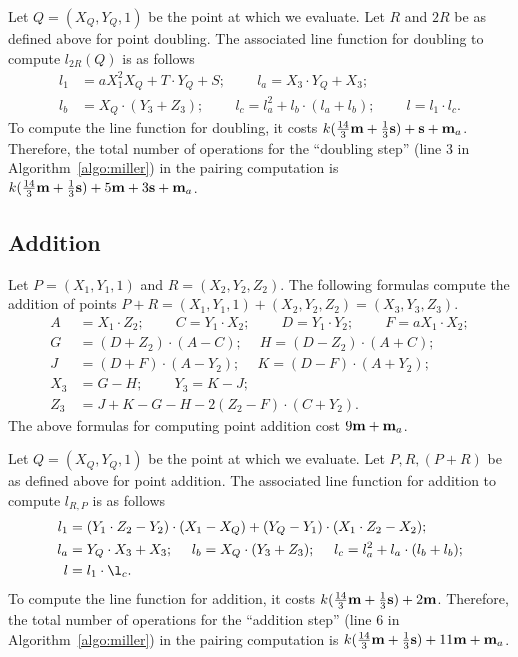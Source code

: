 Let $Q = (X_{Q}, Y_{Q}, 1)$ be the point at which we evaluate.
Let $R$ and $2R$ be as defined above for point doubling.
The associated line function for doubling
to compute $l_{2R}(Q)$ is as follows
\begin{align*}
l_1 &= a X_1^2 X_{Q} + T \cdot Y_{Q} + S;\		\qquad
l_a = X_3 \cdot Y_{Q} + X_3;			\\
l_b &= X_{Q} \cdot (Y_3 + Z_3);\			\qquad
l_c = l_a^2 + l_b \cdot (l_a + l_b);\		\qquad
l = l_1 \cdot l_c.
\end{align*}
To compute the line function for doubling,
it costs 
$k(\frac{14}{3}\textbf{m} + \frac{1}{3}\textbf{s}) + \textbf{s} + \textbf{m}_a$.
Therefore, the total number of operations for the ``doubling step''
({line 3} in Algorithm~\ref{algo:miller}) in the pairing computation is
$k(\frac{14}{3}\textbf{m} + \frac{1}{3}\textbf{s}) + 5\textbf{m} +3\textbf{s} + \textbf{m}_a$.


\subsection{Addition}
Let $P = (X_1,Y_1,1)$ and $R = (X_2,Y_2,Z_2)$.
The following formulas compute the addition of points
$P + R = (X_1,Y_1,1) + (X_2,Y_2,Z_2) = (X_3,Y_3,Z_3)$.
\begin{align*}
A &= X_1 \cdot Z_2;\	\qquad
C = Y_1 \cdot X_2;\	\qquad
D = Y_1 \cdot Y_2;\	\qquad
F = a X_1 \cdot X_2;\\
G &= (D + Z_2) \cdot (A - C);\	\quad
H = (D - Z_2) \cdot (A + C);\\
J &= (D + F) \cdot (A - Y_2);\	\quad
K = (D - F) \cdot (A + Y_2);\\
X_3 &= G - H;\	\qquad
Y_3 = K - J;\\
Z_3 &= J + K - G - H - 2(Z_2 - F) \cdot (C + Y_2).
\end{align*}
The above formulas for computing point addition
cost $9\textbf{m} + \textbf{m}_{a}$.

Let $Q = (X_{Q},Y_{Q},1)$ be the point at which we evaluate.
Let $P,R,(P+R)$ be as defined above for point addition.
The associated line function for addition
to compute $l_{R,P}$ is as follows
\begin{align*}
l_1 &= (Y_1 \cdot Z_2 - Y_2) \cdot (X_1 - X_{Q}) + (Y_{Q} - Y_1) \cdot (X_1 \cdot Z_2 - X_2);\\
l_a &= Y_{Q} \cdot X_3 + X_3;\	\quad
l_b = X_{Q} \cdot (Y_3 + Z_3);\	\quad
l_c = l_a^2 + l_a \cdot (l_b + l_b);\\
l &= l_1 \cdot \l_c.
\end{align*}
To compute the line function for addition,
it costs
$k(\frac{14}{3}\textbf{m} + \frac{1}{3}\textbf{s}) + 2\textbf{m}$.
Therefore, the total number of operations for the ``addition step''
({line 6} in Algorithm~\ref{algo:miller}) in the pairing computation is
$k(\frac{14}{3}\textbf{m} + \frac{1}{3}\textbf{s}) + 11\textbf{m} + \textbf{m}_a$.


